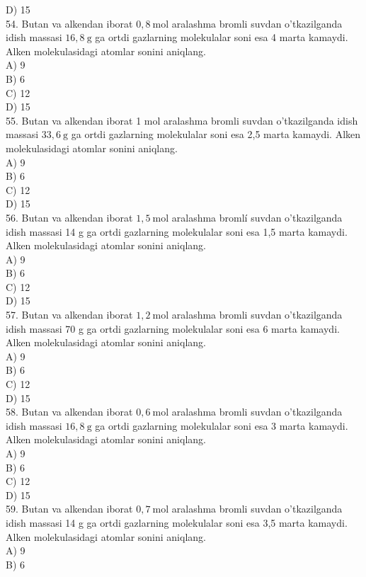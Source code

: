 D) 15\\
54. Butan va alkendan iborat $0,8 \mathrm{~mol}$ aralashma bromli suvdan o'tkazilganda idish massasi $16,8 \mathrm{~g}$ ga ortdi gazlarning molekulalar soni esa 4 marta kamaydi. Alken molekulasidagi atomlar sonini aniqlang.\\
A) 9\\
B) 6\\
C) 12\\
D) 15\\
55. Butan va alkendan iborat 1 mol aralashma bromli suvdan o'tkazilganda idish massasi $33,6 \mathrm{~g}$ ga ortdi gazlarning molekulalar soni esa 2,5 marta kamaydi. Alken molekulasidagi atomlar sonini aniqlang.\\
A) 9\\
B) 6\\
C) 12\\
D) 15\\
56. Butan va alkendan iborat $1,5 \mathrm{~mol}$ aralashma bromlí suvdan o'tkazilganda idish massasi 14 g ga ortdi gazlarning molekulalar soni esa 1,5 marta kamaydi. Alken molekulasidagi atomlar sonini aniqlang.\\
A) 9\\
B) 6\\
C) 12\\
D) 15\\
57. Butan va alkendan iborat $1,2 \mathrm{~mol}$ aralashma bromli suvdan o'tkazilganda idish massasi 70 g ga ortdi gazlarning molekulalar soni esa 6 marta kamaydi. Alken molekulasidagi atomlar sonini aniqlang.\\
A) 9\\
B) 6\\
C) 12\\
D) 15\\
58. Butan va alkendan iborat $0,6 \mathrm{~mol}$ aralashma bromli suvdan o'tkazilganda idish massasi $16,8 \mathrm{~g}$ ga ortdi gazlarning molekulalar soni esa 3 marta kamaydi. Alken molekulasidagi atomlar sonini aniqlang.\\
A) 9\\
B) 6\\
C) 12\\
D) 15\\
59. Butan va alkendan iborat $0,7 \mathrm{~mol}$ aralashma bromli suvdan o'tkazilganda idish massasi 14 g ga ortdi gazlarning molekulalar soni esa 3,5 marta kamaydi. Alken molekulasidagi atomlar sonini aniqlang.\\
A) 9\\
B) 6\\

